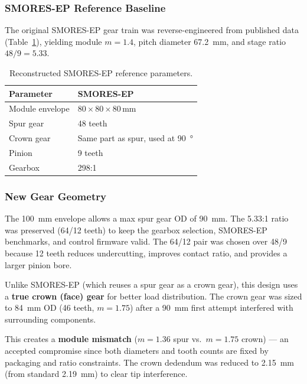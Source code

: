 \documentclass[12pt,a4paper]{article}
\begin{document}
\subsubsection{SMORES-EP Reference Baseline}

The original SMORES-EP gear train was reverse-engineered from published data (Table~\ref{tab:smores-ref}), yielding module $m = 1.4$, pitch diameter \SI{67.2}{mm}, and stage ratio $48/9 = 5.33$.

\begin{table}[H]
	\centering
	\caption{Reconstructed SMORES-EP reference parameters.}
	\label{tab:smores-ref}
	\begin{tabular}{ll}
		\toprule
		\textbf{Parameter} & \textbf{SMORES-EP} \\
		\midrule
		Module envelope & $80 \times 80 \times 80$\,mm \\
		Spur gear       & 48 teeth \\
		Crown gear      & Same part as spur, used at \SI{90}{\degree} \\
		Pinion          & 9 teeth \\
		Gearbox         & 298:1 \\
		\bottomrule
	\end{tabular}
\end{table}

\subsubsection{New Gear Geometry}

The \SI{100}{mm} envelope allows a max spur gear OD of \SI{90}{mm}. The 5.33:1 ratio was preserved (64/12 teeth) to keep the gearbox selection, SMORES-EP benchmarks, and control firmware valid. The 64/12 pair was chosen over 48/9 because 12 teeth reduces undercutting, improves contact ratio, and provides a larger pinion bore.

Unlike SMORES-EP (which reuses a spur gear as a crown gear), this design uses a \textbf{true crown (face) gear} for better load distribution. The crown gear was sized to \SI{84}{mm} OD (46 teeth, $m = 1.75$) after a \SI{90}{mm} first attempt interfered with surrounding components.

This creates a \textbf{module mismatch} ($m = 1.36$ spur vs.\ $m = 1.75$ crown) --- an accepted compromise since both diameters and tooth counts are fixed by packaging and ratio constraints. The crown dedendum was reduced to \SI{2.15}{mm} (from standard \SI{2.19}{mm}) to clear tip interference.
\end{document}

